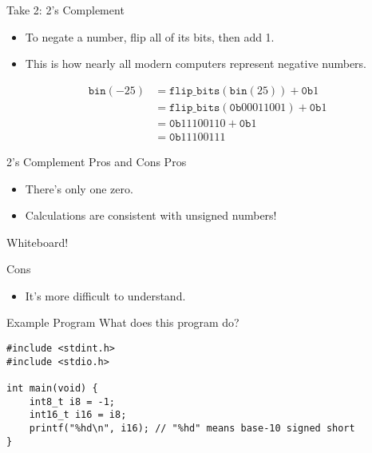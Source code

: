 \documentclass[hyphens,aspectratio=169,dvipsnames]{beamer}
\begin{document}
\begin{frame}{Take 2: 2's Complement}
    \begin{itemize}
        \pause \item To negate a number, flip all of its bits, then add 1.
        \pause \item This is how nearly all modern computers represent negative numbers.
    \end{itemize}

    \pause \begin{align*}
        \texttt{bin}(-25) &= \texttt{flip\_bits}(\texttt{bin}(25)) + \texttt{0b}1 \\
                          &= \texttt{flip\_bits}(\texttt{0b}00011001) + \texttt{0b}1 \\
                          &= \texttt{0b}11100110 + \texttt{0b}1 \\
                          &= \texttt{0b}11100111
    \end{align*}
\end{frame}

\begin{frame}{2's Complement Pros and Cons}
    Pros
    \begin{itemize}
        \pause \item There's only one zero.
        \pause \item Calculations are consistent with unsigned numbers!
    \end{itemize}

    \pause
    \begin{center}Whiteboard!\end{center} %
    \pause

    Cons
    \begin{itemize}
        \pause \item It's more difficult to understand.
    \end{itemize}
\end{frame}

\begin{frame}[fragile]{Example Program}
    What does this program do?
    \begin{center}
        \begin{verbatim}
#include <stdint.h>
#include <stdio.h>

int main(void) {
    int8_t i8 = -1;
    int16_t i16 = i8;
    printf("%hd\n", i16); // "%hd" means base-10 signed short
}
        \end{verbatim}
    \end{center}
\end{frame}
\end{document}

